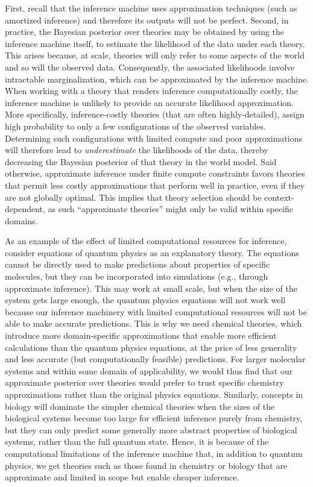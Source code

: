 First, recall that the inference machine uses approximation techniques (such as amortized inference) and therefore its outputs will not be perfect.
Second, in practice, the Bayesian posterior over theories may be obtained by using the inference machine itself, to estimate the likelihood of the data under each theory. This arises because, at scale, theories will only refer to some aspects of the world and so will the observed data. Consequently, the associated likelihoods involve intractable marginalization, which can be approximated by the inference machine. When working with a theory that renders inference computationally costly, the inference machine is unlikely to provide an accurate likelihood approximation. More specifically, inference-costly theories (that are often highly-detailed), assign high probability to only a few configurations of the observed variables. Determining such configurations with limited compute and poor approximations will therefore lead to \emph{underestimate} the likelihoods of the data, thereby decreasing the Bayesian posterior of that theory in the world model. 
Said otherwise, approximate inference under finite compute constraints favors theories that permit less costly approximations that perform well in practice, even if they are not globally optimal. This implies that theory selection should be context-dependent, as such ``approximate theories'' might only be valid within specific domains.

As an example of the effect of limited computational resources for inference, consider equations of quantum physics as an explanatory theory. The equations cannot be directly used to make predictions about properties of specific molecules, but they can be incorporated into simulations (e.g., through approximate inference). This may work at small scale, but when the size of the system gets large enough, the quantum physics equations will not work well because our inference machinery with limited computational resources will not be able to make accurate predictions. This is why we need chemical theories, which introduce more domain-specific approximations that enable more efficient calculations than the quantum physics equations, at the price of less generality and less accurate (but computationally feasible) predictions. For larger molecular systems and within some domain of applicability, we would thus find that our approximate posterior over theories would prefer to trust specific chemistry approximations rather than the original physics equations. Similarly, concepts in biology will dominate the simpler chemical theories when the sizes of the biological systems become too large for efficient inference purely from chemistry, but they can only predict some generally more abstract properties of biological systems, rather than the full quantum state. Hence, it is because of the computational limitations of the inference machine that, in addition to quantum physics, we get theories such as those found in chemistry or biology that are approximate and limited in scope but enable cheaper inference.

